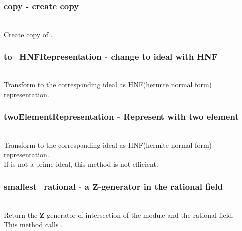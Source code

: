   \subsubsection{copy - create copy}
   \\
   \spacing
   \quad Create copy of .\\
   \spacing
  \subsubsection{to\_HNFRepresentation - change to ideal with HNF}
   \\
   \spacing
   \quad Transform  to the corresponding ideal as HNF(hermite normal form) representation.\\
   \spacing
  \subsubsection{twoElementRepresentation - Represent with two element}
   \\
   \spacing
   \quad Transform  to the corresponding ideal as HNF(hermite normal form) representation.\\
   \spacing
   \quad  If  is not a prime ideal, this method is not efficient.\\
   \spacing 
  \subsubsection{smallest\_rational - a $\mathbf{Z}$-generator in the rational field}
   \\
   \spacing
   \quad Return the $\mathbf{Z}$-generator of intersection of the module  and the rational field.\\
   \spacing
   \quad This method calls .\\
   \spacing
